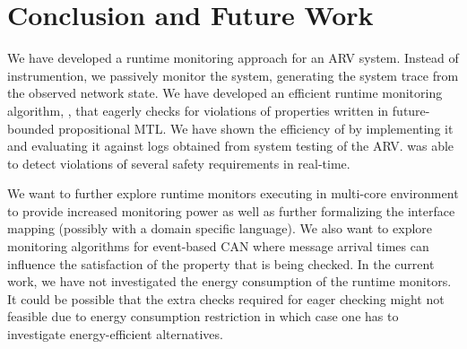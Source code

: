 
\section{Conclusion and Future Work}
We have developed a runtime monitoring approach for an ARV system.
Instead of instrumention, we passively monitor the system,
generating the system trace from the observed network state.
We have developed an efficient runtime monitoring algorithm, \monitor,
that eagerly checks for violations of properties written in future-bounded
propositional MTL. We have shown the efficiency of \monitor by implementing it
and evaluating it against logs obtained from system testing of the ARV.
\monitor was able to detect violations of several safety requirements in real-time.

We want to further explore runtime monitors executing in multi-core environment
to provide increased monitoring power as well as further
formalizing the interface mapping (possibly with a domain specific language).
We also want to explore monitoring algorithms for event-based CAN where
message arrival times can influence the satisfaction of the property that is
being checked. In the current work, we have not investigated the energy consumption
of the runtime monitors. It could be possible that the extra checks required for
eager checking might not feasible due to energy consumption
restriction in which case one has to investigate energy-efficient alternatives.
